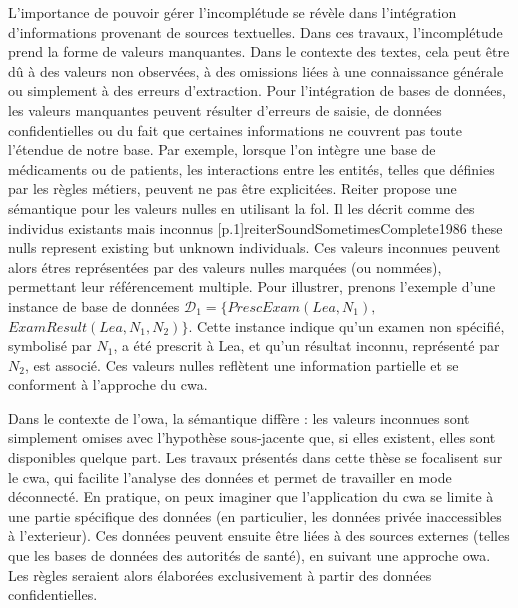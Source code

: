 L'importance de pouvoir gérer l'incomplétude se révèle dans l'intégration d'informations provenant de sources textuelles.
Dans ces travaux, l'incomplétude prend la forme de valeurs manquantes.
Dans le contexte des textes, cela peut être dû à des valeurs non observées, à des omissions liées à une connaissance générale ou simplement à des erreurs d'extraction.
Pour l'intégration de bases de données, les valeurs manquantes peuvent résulter d'erreurs de saisie, de données confidentielles ou du fait que certaines informations ne couvrent pas toute l'étendue de notre base.
Par exemple, lorsque l'on intègre une base de médicaments ou de patients, les interactions entre les entités, telles que définies par les règles métiers, peuvent ne pas être explicitées.
Reiter propose une sémantique pour les valeurs nulles en utilisant la \gls{fol}.
Il les décrit comme des individus existants mais inconnus [p.1]{reiterSoundSometimesComplete1986}{\label{reiterSemantic}\textelp{} these nulls represent existing but unknown individuals}.
Ces valeurs inconnues peuvent alors étres représentées par des valeurs nulles marquées (ou nommées), permettant leur référencement multiple.
Pour illustrer, prenons l'exemple d'une instance de base de données $\mathcal{D}_1= \{PrescExam(Lea, N_1),$ $ExamResult(Lea, N_1, N_2)\}$.
Cette instance indique qu'un examen non spécifié, symbolisé par $N_1$, a été prescrit à Lea, et qu'un résultat inconnu, représenté par $N_2$, est associé.
Ces valeurs nulles reflètent une information partielle et se conforment à l'approche du \gls{cwa}.

Dans le contexte de l'\gls{owa}, la sémantique diffère : les valeurs inconnues sont simplement omises avec l'hypothèse sous-jacente que, si elles existent, elles sont disponibles quelque part.
Les travaux présentés dans cette thèse se focalisent sur le \gls{cwa}, qui facilite l'analyse des données et permet de travailler en mode déconnecté.
En pratique, on peux imaginer que l'application du \gls{cwa} se limite à une partie spécifique des données (en particulier, les données privée inaccessibles à l'exterieur).
Ces données peuvent ensuite être liées à des sources externes (telles que les bases de données des autorités de santé), en suivant une approche \gls{owa}.
Les règles seraient alors élaborées exclusivement à partir des données confidentielles.

